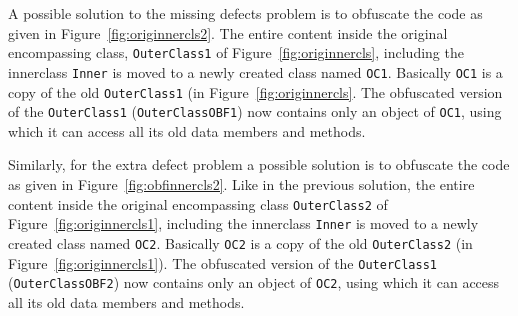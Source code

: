 \documentclass[conference]{IEEEtran}
\begin{document}
% 	
%   
%   
%  
%  
%      

A possible solution to the missing defects problem is to obfuscate the code as given in Figure~\ref{fig:originnercls2}. 
The entire content inside the original encompassing class, {\tt OuterClass1} of Figure~\ref{fig:originnercls}, including the innerclass {\tt Inner} is moved to a newly 
created class named {\tt OC1}. Basically {\tt OC1} is a copy of the old {\tt OuterClass1} (in Figure~\ref{fig:originnercls}. 
The obfuscated version of the {\tt OuterClass1} ({\tt OuterClassOBF1}) now contains only an object of {\tt OC1}, using which it can 
access all its old data members and methods. 

Similarly, for the extra defect problem a possible solution is to obfuscate the code as given in Figure~\ref{fig:obfinnercls2}. 
Like in the previous solution, the entire content inside the original encompassing class {\tt OuterClass2} of Figure~\ref{fig:originnercls1}, 
including the innerclass {\tt Inner} is moved to a newly created class named {\tt OC2}. Basically {\tt OC2} is a copy of the old {\tt OuterClass2} 
(in Figure~\ref{fig:originnercls1}). The obfuscated version of the {\tt OuterClass1} ({\tt OuterClassOBF2}) now contains only an object of {\tt OC2}, 
using which it can access all its old data members and methods. 
\end{document}
